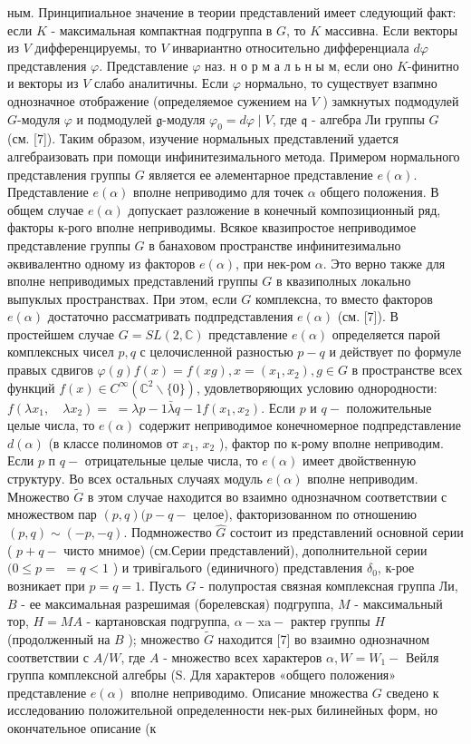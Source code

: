 \documentclass[10pt]{article}
\begin{document}
ным. Принципиальное значение в теории представлений имеет следующий факт: если $K$ - максимальная компактная подгруппа в $G$, то $K$ массивна. Если векторы из $V$ дифференцируемы, то $V$ инвариантно относительно дифференциала $d \varphi$ представления $\varphi$. Представление $\varphi$ наз. н о р м а л ь н ы м, если оно $K$-финитно и векторы из $V$ слабо аналитичны. Если $\varphi$ нормально, то существует взапмно однозначное отображение (определяемое сужением на $V$ ) замкнутых подмодулей $G$-модуля $\varphi$ и подмодулей $\mathfrak{g}$-модуля $\varphi_{0}=d \varphi \mid V$, где $\mathfrak{q}$ - алгебра Ли группы $G$ (см. [7]). Таким образом, изучение нормальных представлений удается алгебраизовать при помощи инфинитезимального метода. Примером нормального представления группы $G$ является ее әлементарное представление $e(\alpha)$. Представление $e(\alpha)$ вполне неприводимо для точек $\alpha$ общего положения. В общем случае $e(\alpha)$ допускает разложение в конечный композиционный ряд, факторы к-рого вполне неприводимы. Всякое квазипростое неприводимое представление группы $G$ в банаховом пространстве инфинитезимально әквивалентно одному из факторов $e(\alpha)$, при нек-ром $\alpha$. Это верно также для вполне неприводимых представлений группы $G$ в квазиполных локально выпуклых пространствах. При этом, если $G$ комплексна, то вместо факторов $e(\alpha)$ достаточно рассматривать подпредставления $e(\alpha)$ (см. [7]). В простейшем случае $G=S L(2, \mathbb{C})$ представление $e(\alpha)$ определяется парой комплексных чисел $p, q$ с целочисленной разностью $p-q$ и действует по формуле правых сдвигов $\varphi(g) f(x)=f(x g), x=\left(x_{1}, x_{2}\right), g \in G$ в пространстве всех функций $f(x) \in C^{\infty}\left(\mathbb{C}^{2} \backslash\{0\}\right)$, удовлетворяющих условию однородности: $f\left(\lambda x_{1}, \quad \lambda x_{2}\right)=$ $=\lambda p-1 \bar{\lambda} q-1 f\left(x_{1}, x_{2}\right)$. Если $p$ и $q-$ положительные целые числа, то $e(\alpha)$ содержит неприводимое конечномерное подпредставление $d(\alpha)$ (в классе полиномов от $x_{1}$, $x_{2}$ ), фактор по к-рому вполне неприводим. Если $p$ п $q-$ отрицательные целые числа, то $e(\alpha)$ имеет двойственную структуру. Во всех остальных случаях модуль $e(\alpha)$ вполне неприводим. Множество $\tilde{G}$ в этом случае находится во взаимно однозначном соответствии с множеством пар $(p, q)(p-q-$ целое), факторизованном по отношению $(p, q) \sim(-p,-q)$. Подмножество $\widehat{G}$ состоит из представлений основной серии ( $p+q-$ чисто мнимое) (см.Серии представлений), дополнительной серии $(0 \leqslant p=$ $=q<1$ ) и тривігалього (единичного) представления $\delta_{0}$, к-рое возникает при $p=q=1$. Пусть $G$ - полупростая связная комплексная группа Ли, $B$ - ее максимальная разрешимая (борелевская) подгруппа, $M$ - максимальный тор, $H=M A$ - картановская подгруппа, $\alpha-\mathrm{xa-}$ рактер группы $H$ (продолженный на $B$ ); множество $\tilde{G}$ находится [7] во взаимно однозначном соответствии с $A / W$, где $A$ - множество всех характеров $\alpha, W=W_{1}-$ Вейля группа комплексной алгебры (S. Для характеров «общего положения» представление $e(\alpha)$ вполне неприводимо. Описание множества $G$ сведено к исследованию положительной определенности нек-рых билинейных форм, но окончательное описание (к 
\end{document}
